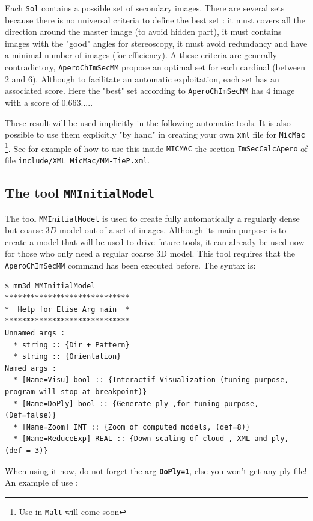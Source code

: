 Each {\tt Sol} contains a possible set of secondary images. There are several sets because there is no universal
criteria to define the best set : it must covers  all the direction around the master image
(to avoid hidden part), it must contains images with the "good" angles for stereoscopy, it
must avoid redundancy and have a minimal number of images (for efficiency). A these criteria
are generally contradictory, {\tt AperoChImSecMM} propose an optimal set for each cardinal
(between $2$ and $6$). Although to facilitate an automatic exploitation, each set has an
associated score. Here the "best" set according to {\tt AperoChImSecMM} has $4$ image with
a score of $0.663....$.

These result will be used implicitly in the following automatic tools. It is also possible to use them explicitly
"by hand" in creating your own {\tt xml} file for {\tt MicMac} \footnote{Use in {\tt Malt} will come soon}.
See for example of how to use this inside {\tt MICMAC} the section {\tt ImSecCalcApero} of file
{\tt include/XML\_MicMac/MM-TieP.xml}.



\subsection{The tool {\tt MMInitialModel}}

The tool {\tt MMInitialModel} is used to create fully automatically a regularly dense but coarse $3D$ model
out of a set of images. Although its main purpose is to create a model that will be used
to drive future tools, it can already be used now for those who only need a regular coarse 3D model.
This tool requires that the {\tt AperoChImSecMM} command has been executed before.
The syntax is:

\begin{verbatim}
$ mm3d MMInitialModel
*****************************
*  Help for Elise Arg main  *
*****************************
Unnamed args :
  * string :: {Dir + Pattern}
  * string :: {Orientation}
Named args :
  * [Name=Visu] bool :: {Interactif Visualization (tuning purpose, program will stop at breakpoint)}
  * [Name=DoPly] bool :: {Generate ply ,for tuning purpose, (Def=false)}
  * [Name=Zoom] INT :: {Zoom of computed models, (def=8)}
  * [Name=ReduceExp] REAL :: {Down scaling of cloud , XML and ply, (def = 3)}
\end{verbatim}

When using it now, do not forget the arg {\tt \bf DoPly=1}, else you won't get any ply file! An example of use :



